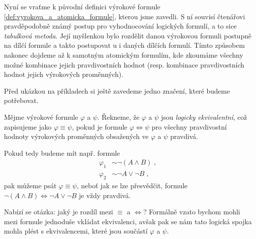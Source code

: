Nyní se vraťme k původní definici výrokové formule \ref{def:vyrokova_a_atomicka_formule}, kterou jsme zavedli. S ní souvisí čtenářovi pravděpodobně známý postup pro vyhodnocování logických formulí, a to sice \emph{tabulková metoda}. Její myšlenkou bylo rozdělit danou výrokovou formuli postupně na dílčí formule a takto postupovat u i daných dílčích formulí. Tímto způsobem nakonec dojdeme až k samotným atomickým formulím, kde zkoumáme všechny možné kombinace jejich pravdivostních hodnot (resp. kombinace pravdivostních hodnot jejich výrokových proměnných).\par

Před ukázkou na příkladech si ještě zavedeme jedno značení, které budeme potřebovat.
\begin{definition}
    Mějme výrokové formule $\varphi$ a $\psi$. Řekneme, že $\varphi$ a $\psi$ jsou \emph{logicky ekvivalentní}, což zapisujeme jako $\varphi\equiv\psi$, pokud je formule $\varphi \iff \psi$ pro všechny pravdivostní hodnoty výrokových proměnných obsažených ve $\varphi$ a $\psi$ pravdivá.
\end{definition}

Pokud tedy budeme mít např. formule
\begin{align*}
    \varphi_1 &\sim \neg (A \land B)\; ,\\
    \varphi_2 &\sim \neg A \lor \neg B\; ,
\end{align*}
pak můžeme psát $\varphi\equiv\psi$, neboť jak se lze přesvědčit, formule $\neg (A \land B) \iff \neg A \lor \neg B$ je vždy pravdivá.\par
Nabízí se otázka: jaký je rozdíl mezi $\equiv$ a $\iff$? Formálně vzato bychom mohli mezi formule jednoduše vkládat ekvivalenci, avšak pak se nám tato logická spojka mohla plést s ekvivalencemi, které jsou součástí $\varphi$ a $\psi$.


